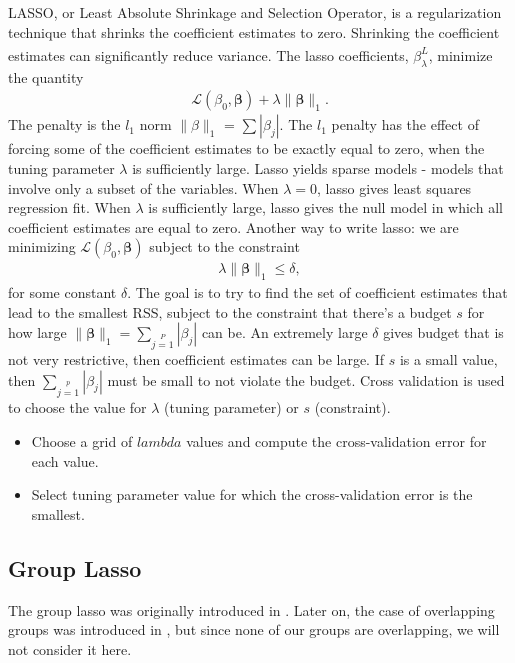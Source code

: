 \documentclass[10pt]{article}
\begin{document}
LASSO, or Least Absolute Shrinkage and Selection Operator, is a regularization technique that shrinks the coefficient estimates to zero. Shrinking the coefficient estimates can significantly reduce variance. The lasso coefficients, $\hat{\beta_{\lambda}^{L}}$, minimize the quantity 
    \begin{align}
    \label{lasso}
         \mathcal{L}(\beta_{0},\bm{\beta}) + \lambda \| \bm{\beta} \|_{1}.
    \end{align}
The penalty is the $l_{1}$ norm $\|\beta\|_{1}$ = $\sum|\beta_{j}|$. The $l_{1}$ penalty has the effect of forcing some of the coefficient estimates to be exactly equal to zero, when the tuning parameter $\lambda$ is sufficiently large. Lasso yields sparse models - models that involve only a subset of the variables. When $\lambda = 0$, lasso gives least squares regression fit. When $\lambda$ is sufficiently large, lasso gives the null model in which all coefficient estimates are equal to zero. Another way to write lasso: we are minimizing $\mathcal{L}(\beta_0, \bm{\beta})$ subject to the constraint
    \begin{align*}
        \lambda \| \bm{\beta} \|_{1} \le \delta,
    \end{align*}
for some constant $\delta$. The goal is to try to find the set of coefficient estimates that lead to the smallest RSS, subject to the constraint that there's a budget $s$  for how large $\| \bm{\beta} \|_1 =  \sum\limits_{j=1}\limits^{P} |\beta_{j}|$ can be. An extremely large $\delta$ gives budget that is not very restrictive, then coefficient estimates can be large. If $s$ is a small value, then $\sum\limits_{j=1}\limits^{p} |\beta_{j}|$ must be small to not violate the budget. 
Cross validation is used to choose the value for $\lambda$ (tuning parameter) or $s$ (constraint).
\begin{itemize}
     \item Choose a grid of $lambda$ values and compute the cross-validation error for each value.
     \item Select tuning parameter value for which the cross-validation error is the smallest. 
\end{itemize}




\subsection{Group Lasso}

The group lasso was originally introduced in \cite{yuan2006model}. Later on, the case of overlapping groups was introduced in \cite{jacob2009group}, but since none of our groups are overlapping, we will not consider it here. 
\end{document}
